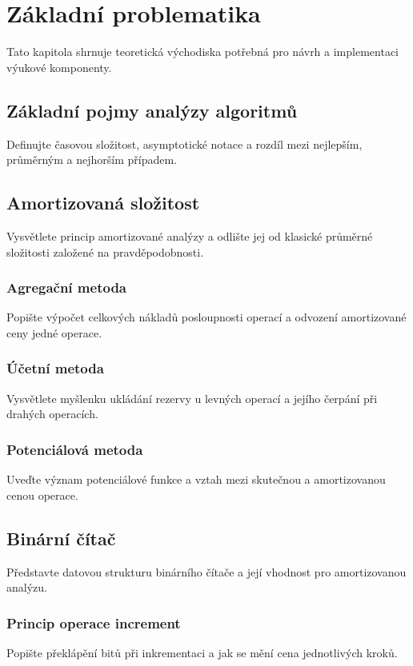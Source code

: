 \chapter{Základní problematika}

Tato kapitola shrnuje teoretická východiska potřebná pro návrh a implementaci výukové komponenty.

\section{Základní pojmy analýzy algoritmů}
Definujte časovou složitost, asymptotické notace a rozdíl mezi nejlepším, průměrným a nejhorším případem.

\section{Amortizovaná složitost}
Vysvětlete princip amortizované analýzy a odlište jej od klasické průměrné složitosti založené na pravděpodobnosti.

\subsection{Agregační metoda}
Popište výpočet celkových nákladů posloupnosti operací a odvození amortizované ceny jedné operace.

\subsection{Účetní metoda}
Vysvětlete myšlenku ukládání rezervy u levných operací a jejího čerpání při drahých operacích.

\subsection{Potenciálová metoda}
Uveďte význam potenciálové funkce a vztah mezi skutečnou a amortizovanou cenou operace.

\section{Binární čítač}
Představte datovou strukturu binárního čítače a její vhodnost pro amortizovanou analýzu.

\subsection{Princip operace increment}
Popište překlápění bitů při inkrementaci a jak se mění cena jednotlivých kroků.

